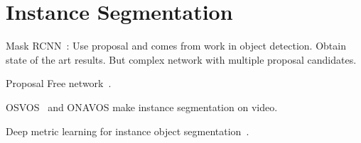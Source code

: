 


\section{Instance Segmentation}

Mask RCNN~\cite{he2017mask}: Use proposal and comes from work in object detection. Obtain state of the art results. But complex network with multiple proposal candidates.

Proposal Free network~\cite{liang2015proposal}.

OSVOS~\cite{caelles2017one} and ONAVOS make instance segmentation on video.

Deep metric learning for instance object segmentation~\cite{fathi2017semantic}.
